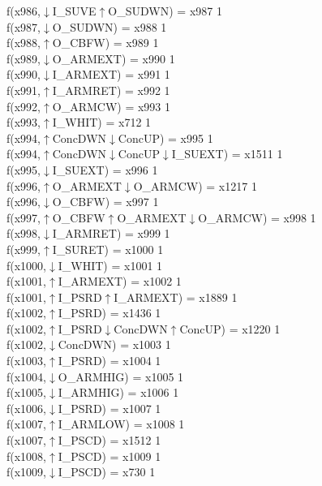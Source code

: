 f(x986,$\downarrow$I\_SUVE$\uparrow$O\_SUDWN) = x987 {1} \\
f(x987,$\downarrow$O\_SUDWN) = x988 {1} \\
f(x988,$\uparrow$O\_CBFW) = x989 {1} \\
f(x989,$\downarrow$O\_ARMEXT) = x990 {1} \\
f(x990,$\downarrow$I\_ARMEXT) = x991 {1} \\
f(x991,$\uparrow$I\_ARMRET) = x992 {1} \\
f(x992,$\uparrow$O\_ARMCW) = x993 {1} \\
f(x993,$\uparrow$I\_WHIT) = x712 {1} \\
f(x994,$\uparrow$ConcDWN$\downarrow$ConcUP) = x995 {1} \\
f(x994,$\uparrow$ConcDWN$\downarrow$ConcUP$\downarrow$I\_SUEXT) = x1511 {1} \\
f(x995,$\downarrow$I\_SUEXT) = x996 {1} \\
f(x996,$\uparrow$O\_ARMEXT$\downarrow$O\_ARMCW) = x1217 {1} \\
f(x996,$\downarrow$O\_CBFW) = x997 {1} \\
f(x997,$\uparrow$O\_CBFW$\uparrow$O\_ARMEXT$\downarrow$O\_ARMCW) = x998 {1} \\
f(x998,$\downarrow$I\_ARMRET) = x999 {1} \\
f(x999,$\uparrow$I\_SURET) = x1000 {1} \\
f(x1000,$\downarrow$I\_WHIT) = x1001 {1} \\
f(x1001,$\uparrow$I\_ARMEXT) = x1002 {1} \\
f(x1001,$\uparrow$I\_PSRD$\uparrow$I\_ARMEXT) = x1889 {1} \\
f(x1002,$\uparrow$I\_PSRD) = x1436 {1} \\
f(x1002,$\uparrow$I\_PSRD$\downarrow$ConcDWN$\uparrow$ConcUP) = x1220 {1} \\
f(x1002,$\downarrow$ConcDWN) = x1003 {1} \\
f(x1003,$\uparrow$I\_PSRD) = x1004 {1} \\
f(x1004,$\downarrow$O\_ARMHIG) = x1005 {1} \\
f(x1005,$\downarrow$I\_ARMHIG) = x1006 {1} \\
f(x1006,$\downarrow$I\_PSRD) = x1007 {1} \\
f(x1007,$\uparrow$I\_ARMLOW) = x1008 {1} \\
f(x1007,$\uparrow$I\_PSCD) = x1512 {1} \\
f(x1008,$\uparrow$I\_PSCD) = x1009 {1} \\
f(x1009,$\downarrow$I\_PSCD) = x730 {1} \\

